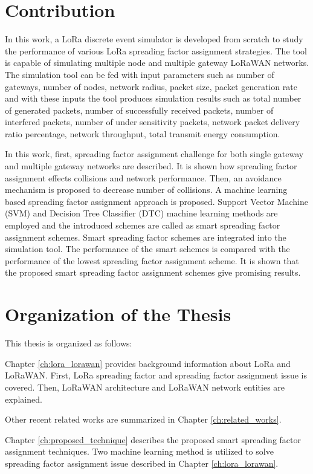 \section{Contribution}
In this work, a LoRa discrete event simulator is developed from scratch to study the performance of various LoRa spreading factor assignment strategies. The tool is capable of simulating multiple node and multiple gateway LoRaWAN networks. The simulation tool can be fed with input parameters such as number of gateways, number of nodes, network radius, packet size, packet generation rate and with these inputs the tool produces simulation results such as total number of generated packets, number of successfully received packets, number of interfered packets, number of under sensitivity packets, network packet delivery ratio percentage, network throughput, total transmit energy consumption. 

In this work, first, spreading factor assignment challenge for both single gateway and multiple gateway networks are described. It is shown how spreading factor assignment effects collisions and network performance. Then, an avoidance mechanism is proposed to decrease number of collisions. A machine learning based spreading factor assignment approach is proposed. Support Vector Machine (SVM) and Decision Tree Classifier (DTC) machine learning methods are employed and the introduced schemes are called as smart spreading factor assignment schemes. Smart spreading factor schemes are integrated into the simulation tool. The performance of the smart schemes is compared with the performance of the lowest spreading factor assignment scheme. It is shown that the proposed smart spreading factor assignment schemes give promising results.

\section{Organization of the Thesis}
This thesis is organized as follows:

Chapter \ref{ch:lora_lorawan} provides background information about LoRa and LoRaWAN. First, LoRa spreading factor and spreading factor assignment issue is covered. Then, LoRaWAN architecture and LoRaWAN network entities are explained.

Other recent related works are summarized in Chapter \ref{ch:related_works}.

Chapter \ref{ch:proposed_technique} describes the proposed smart spreading factor assignment techniques. Two machine learning method is utilized to solve spreading factor assignment issue described in Chapter \ref{ch:lora_lorawan}.

